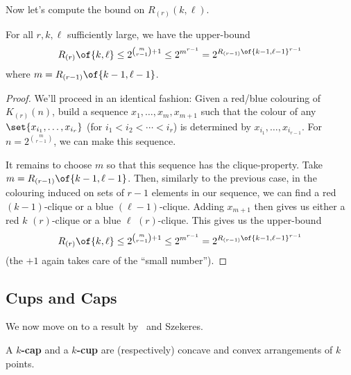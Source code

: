 Now let's compute the bound on $R_{(r)}(k, \ell)$.

\begin{boxtheorem}
    For all $r, k, \ell$ sufficiently large, we have the upper-bound
    \begin{align*}
        R_{(r)}\of{k, \ell} \leq 2^{\binom{m}{r - 1} + 1} \leq 2^{m^{r - 1}} = 2^{R_{(r - 1)}\of{k - 1, \ell - 1}^{r - 1}}
    \end{align*}
    where $m = R_{(r - 1)}\of{k - 1, \ell - 1}$.
\end{boxtheorem}
\begin{proof}
    We'll proceed in an identical fashion: Given a red/blue colouring of $K_{(r)}(n)$, build a sequence $x_1, \ldots, x_m, x_{m + 1}$ such that the colour of any $\set{x_{i_1}, \ldots, x_{i_r}}$ (for $i_1 < i_2 < \cdots < i_r$) is determined by $x_{i_1}, \ldots, x_{i_{r - 1}}$. For $n = 2^{\binom{m}{r - 1}}$, we can make this sequence.

    It remains to choose $m$ so that this sequence has the clique-property. Take $m = R_{(r - 1)}\of{k - 1, \ell - 1}$. Then, similarly to the previous case, in the colouring induced on sets of $r - 1$ elements in our sequence, we can find a red $(k - 1)$-clique or a blue $(\ell - 1)$-clique. Adding $x_{m + 1}$ then gives us either a red $k$ $(r)$-clique or a blue $\ell$ $(r)$-clique. This gives us the upper-bound
    \begin{align*}
        R_{(r)}\of{k, \ell} \leq 2^{\binom{m}{r - 1} + 1} \leq 2^{m^{r - 1}} = 2^{R_{(r - 1)}\of{k - 1, \ell - 1}^{r - 1}}
    \end{align*}
    (the $+1$ again takes care of the ``small number'').
\end{proof}

\subsection{Cups and Caps}

We now move on to a result by \Erdos\ and Szekeres.

\begin{boxdefinition}
    A \textbf{$k$-cap} and a \textbf{$k$-cup} are (respectively) concave and convex arrangements of $k$ points.
\end{boxdefinition}

\begin{figure}[H]
    \centering
    \hspace{2cm}
\end{figure}

